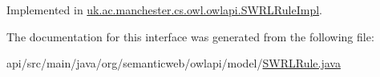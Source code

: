 Implemented in \hyperlink{classuk_1_1ac_1_1manchester_1_1cs_1_1owl_1_1owlapi_1_1_s_w_r_l_rule_impl_a04ba2021aafa052a179bfcf06a53aea4}{uk.\-ac.\-manchester.\-cs.\-owl.\-owlapi.\-S\-W\-R\-L\-Rule\-Impl}.



The documentation for this interface was generated from the following file\-:\begin{DoxyCompactItemize}
\item 
api/src/main/java/org/semanticweb/owlapi/model/\hyperlink{_s_w_r_l_rule_8java}{S\-W\-R\-L\-Rule.\-java}\end{DoxyCompactItemize}
